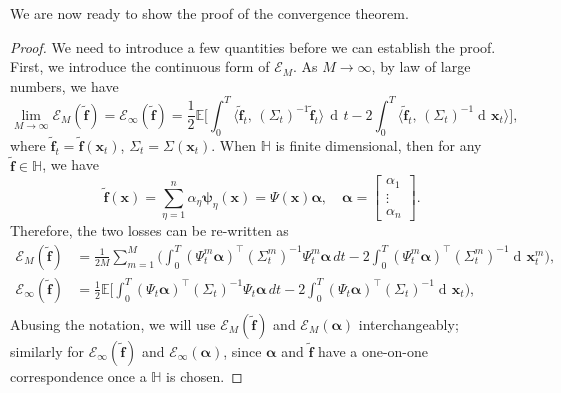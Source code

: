\documentclass[11pt]{article} %
\def\rvx{{\mathbf{x}}}
\def\vf{{\bm{f}}}
\def\vx{{\bm{x}}}
\def\sH{{\mathbb{H}}}
\newcommand{\E}{\mathbb{E}}
\DeclareMathOperator{\dif}{d \!}        %
\newcommand{\dt}{\dif t}
\newcommand{\psivec}{\bm\psi}
\newcommand{\alphavec}{\bm\alpha}
\newcommand{\inp}[1]{\langle #1 \rangle}
\newcommand{\loss}{\mathcal{E}}
\begin{document}
We are now ready to show the proof of the convergence theorem.
\begin{proof}
We need to introduce a few quantities before we can establish the proof.  First, we introduce the continuous form of $\loss_M$.  As $M \rightarrow \infty$, by law of large numbers, we have
\[
\lim_{M \rightarrow \infty}\loss_M(\tilde\vf) = \loss_{\infty}(\tilde\vf) = \frac{1}{2}\E\big[\int_0^T\inp{\tilde\vf_t, \,(\Sigma_t)^{-1}\tilde\vf_t} \, \dt - 2\int_0^T\inp{\tilde\vf_t, \,(\Sigma_t)^{-1}\dif\rvx_t}\big],
\]
where $\tilde\vf_t = \tilde\vf(\rvx_t)$, $\Sigma_t = \Sigma(\rvx_t)$.  When $\sH$ is finite dimensional, then for any $\tilde\vf \in \sH$, we have
\[
\tilde\vf(\vx) = \sum_{\eta = 1}^n\alpha_{\eta}\psivec_{\eta}(\vx) = \Psi(\vx)\alphavec, \quad \alphavec = \begin{bmatrix} \alpha_1 \\ \vdots \\ \alpha_n\end{bmatrix}.
\]
Therefore, the two losses can be re-written as
\[
\begin{aligned}
    \loss_M(\tilde\vf) &= \frac{1}{2M}\sum_{m = 1}^M\Big(\int_0^T(\Psi_t^m\alphavec)^\intercal(\Sigma_t^m)^{-1}\Psi_t^m\alphavec \, dt - 2\int_0^T(\Psi_t^m\alphavec)^\intercal(\Sigma_t^m)^{-1}\dif\rvx_t^m\Big), \\
    \loss_{\infty}(\tilde\vf) &= \frac{1}{2}\E\Big[\int_0^T(\Psi_t\alphavec)^\intercal(\Sigma_t)^{-1}\Psi_t\alphavec \, dt - 2\int_0^T(\Psi_t\alphavec)^\intercal(\Sigma_t)^{-1}\dif\rvx_t\Big), \\    
\end{aligned}
\]
Abusing the notation, we will use $\loss_M(\tilde\vf)$ and $\loss_M(\alphavec)$ interchangeably; similarly for $\loss_{\infty}(\tilde\vf)$ and $\loss_{\infty}(\alphavec)$, since $\alphavec$ and $\tilde\vf$ have a one-on-one correspondence once a $\sH$ is chosen.


\end{proof}
\end{document}
